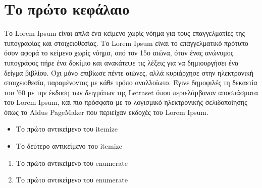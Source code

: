 \chapter{Το πρώτο κεφάλαιο}
    Το Lorem Ipsum είναι απλά ένα κείμενο χωρίς νόημα για τους επαγγελματίες της τυπογραφίας και στοιχειοθεσίας.
    Το Lorem Ipsum είναι το επαγγελματικό πρότυπο όσον αφορά το κείμενο χωρίς νόημα, από τον 15ο αιώνα, όταν ένας ανώνυμος
    τυπογράφος πήρε ένα δοκίμιο και ανακάτεψε τις λέξεις για να δημιουργήσει ένα δείγμα βιβλίου. Όχι μόνο επιβίωσε πέντε αιώνες,
    αλλά κυριάρχησε στην ηλεκτρονική στοιχειοθεσία, παραμένοντας με κάθε τρόπο αναλλοίωτο. Έγινε δημοφιλές τη δεκαετία του '60
    με την έκδοση των δειγμάτων της Letraset όπου περιελάμβαναν αποσπάσματα του Lorem Ipsum, και πιο πρόσφατα με το λογισμικό
    ηλεκτρονικής σελιδοποίησης όπως το Aldus PageMaker που περιείχαν εκδοχές του Lorem Ipsum. \cite{article-full}

    \begin{itemize}
        \item Το πρώτο αντικείμενο του itemize
        \item Το δεύτερο αντικείμενο του itemize
    \end{itemize}

    \begin{enumerate}
        \item Το πρώτο αντικείμενο του enumerate
        \item Το πρώτο αντικείμενο του enumerate
    \end{enumerate}
    
\newpage
